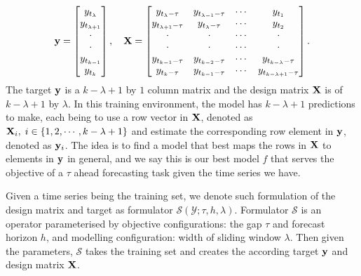 \begin{equation*}
    \mathbf{y} = \begin{bmatrix}
        y_{t_\lambda}       \\
        y_{t_{\lambda + 1}} \\
        \cdot               \\
        \cdot               \\
        y_{t_{k-1}}         \\
        y_{t_k}             \\
    \end{bmatrix}
    , \quad
    \mathbf{X} = \begin{bmatrix}
        y_{t_{\lambda} - \tau}   & y_{t_{\lambda-1} - \tau} & \cdots & y_{t_{1}} \\
        y_{t_{\lambda+1} - \tau} & y_{t_{\lambda} - \tau}   & \cdots & y_{t_{2}} \\
        \cdot                    & \cdot                    & \cdots & \cdot     \\
        \cdot                    & \cdot                    & \cdots & \cdot     \\
        y_{t_{k-1} - \tau}       & y_{t_{k-2} - \tau}       & \cdots & y_{t_{k - \lambda} - \tau}     \\
        y_{t_{k} - \tau}         & y_{t_{k-1} - \tau}       & \cdots & y_{t_{k - \lambda + 1} - \tau} \\
    \end{bmatrix}.
\end{equation*}
The target $\mathbf{y}$ is a $k-\lambda+1$ by $1$ column matrix and the design matrix $\mathbf{X}$ is of $k-\lambda+1$ by $\lambda$. In this training environment, the model has $k-\lambda + 1$ predictions to make, each being to use a row vector in $\mathbf{X}$, denoted as $\mathbf{X}_i, \; i \in \{1, 2, \cdots, k-\lambda+1 \}$ and estimate the corresponding row element in $\mathbf{y}$, denoted as $\mathbf{y}_i$. The idea is to find a model that best maps the rows in $\mathbf{X}$ to elements in $\mathbf{y}$ in general, and we say this is our best model $f$ that serves the objective of a $\tau$ ahead forecasting task given the time series we have.

Given a time series being the training set, we denote such formulation of the design matrix and target as formulator $\mathcal{S}(\mathcal{Y};\tau, h, \lambda)$. Formulator $\mathcal{S}$ is an operator parameterised by objective configurations: the gap $\tau$ and forecast horizon $h$, and modelling configuration: width of sliding window $\lambda$. Then given the parameters, $\mathcal{S}$ takes the training set and creates the according target $\mathbf{y}$ and design matrix $\mathbf{X}$.

